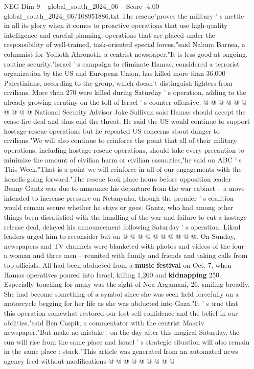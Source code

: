 \begin{textsample}{NEG Dim 9 – global\_south\_2024\_06 – Score -4.00 – global\_south\_2024\_06/108951886.txt}
The rescue"proves the military ' s mettle in all its glory when it comes to proactive operations that use high-quality intelligence and careful planning, operations that are placed under the responsibility of well-trained, task-oriented special forces,"said Nahum Barnea, a columnist for Yedioth Ahronoth, a centrist newspaper."It is less good at ongoing, routine security."Israel ' s campaign to eliminate Hamas, considered a terrorist organization by the US and European Union, has killed more than 36,000 Palestinians, according to the group, which doesn't distinguish fighters from civilians.
More than 270 were killed during Saturday ' s operation, adding to the already growing scrutiny on the toll of Israel ' s counter-offensive. @ @ @ @ @ @ @ @ @ @ National Security Advisor Jake Sullivan said Hamas should accept the cease-fire deal and thus end the threat.
He said the US would continue to support hostage-rescue operations but he repeated US concerns about danger to civilians."We will also continue to reinforce the point that all of their military operations, including hostage rescue operations, should take every precaution to minimize the amount of civilian harm or civilian casualties,"he said on ABC ' s This Week."That is a point we will reinforce in all of our engagements with the Israelis going forward."The rescue took place hours before opposition leader Benny Gantz was due to announce his departure from the war cabinet -- a move intended to increase pressure on Netanyahu, though the premier ' s coalition would remain secure whether he stays or goes.
Gantz, who had among other things been dissatisfied with the handling of the war and failure to cut a hostage release deal, delayed his announcement following Saturday ' s operation.
Likud leaders urged him to reconsider but on @ @ @ @ @ @ @ @ @ @.
On Sunday, newspapers and TV channels were blanketed with photos and videos of the four -- a woman and three men -- reunited with family and friends and taking calls from top officials.
All had been abducted from a \textbf{music} \textbf{festival} on Oct. 7, when Hamas operatives poured into Israel, killing 1,200 and \textbf{kidnapping} 250.
Especially touching for many was the sight of Noa Argamani, 26, smiling broadly.
She had become something of a symbol since she was seen held forcefully on a motorcycle begging for her life as she was abducted into Gaza."It ' s true that this operation somewhat restored our lost self-confidence and the belief in our abilities,"said Ben Caspit, a commentator with the centrist Maariv newspaper."But make no mistake : on the day after this magical Saturday, the sun will rise from the same place and Israel ' s strategic situation will also remain in the same place : stuck."This article was generated from an automated news agency feed without modifications @ @ @ @ @ @ @ @ @

\end{textsample}

